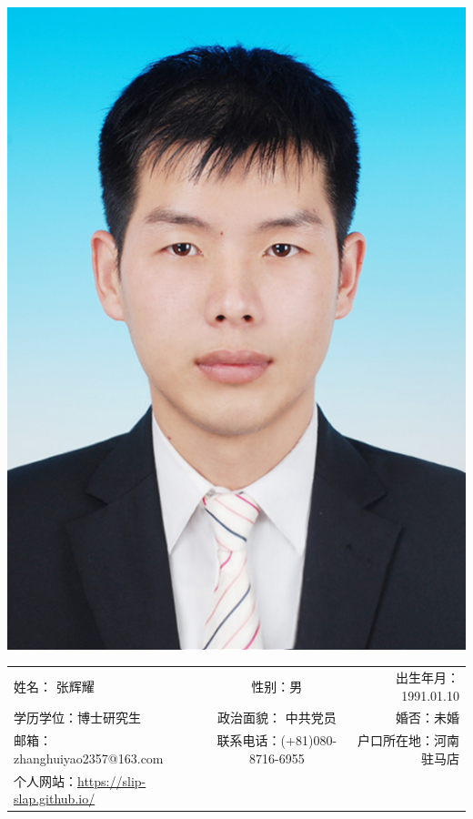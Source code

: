 
\begin{minipage}{0.2\textwidth}
	\includegraphics[scale=1.1]{8574.png}
\end{minipage}
\hfill
\begin{minipage}{0.8\textwidth}
	\renewcommand{\arraystretch}{2.2}
	\begin{adjustbox}{width=1\linewidth}
		\begin{tabular}{lcr}
			姓名： 张辉耀 & 性别：男 & 出生年月：1991.01.10 \\
			学历学位：博士研究生 & 政治面貌： 中共党员 & 婚否：未婚 \\
			邮箱： zhanghuiyao2357@163.com & 联系电话：(+81)080-8716-6955 &
			户口所在地：河南驻马店 \\
			个人网站：\url{https://slip-slap.github.io/} & &\\
		\end{tabular}
	\renewcommand{\arraystretch}{0.5}
	\end{adjustbox}
\end{minipage}
